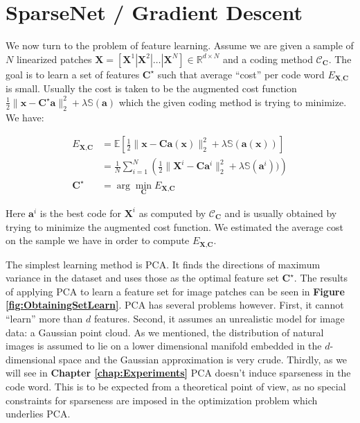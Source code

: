 \documentclass[12pt,a4paper,oneside,english]{UPBThesis}
\newcommand{\hctimes}[2]{{#1}\!\times\!{#2}}
\begin{document}
\section{SparseNet / Gradient Descent}
\label{sec:SparseNetGradientDescent}

We now turn to the problem of feature learning. Assume we are given a sample of $N$ linearized patches $\textbf{X} = \left[ \textbf{X}^1 \left|\right. \textbf{X}^2 \left|\right. \dots \left|\right. \textbf{X}^N \right] \in \mathbb{R}^{\hctimes{d}{N}}$ and a coding method $\mathcal{C}_\textbf{C}$. The goal is to learn a set of features $\textbf{C}^\star$ such that average ``cost'' per code word $E_{\textbf{X},\textbf{C}}$ is small. Usually the cost is taken to be the augmented cost function $\frac{1}{2} \| \textbf{x} - \textbf{C}^\star\textbf{a} \|_2^2 + \lambda \mathbb{S}(\textbf{a})$ which the given coding method is trying to minimize. We have:

\begin{align*}
E_{\textbf{X},\textbf{C}} & = \mathbb{E} [ \frac{1}{2} \| \textbf{x} - \textbf{C}\textbf{a}(\textbf{x}) \|_2^2 + \lambda\mathbb{S}(\textbf{a}(\textbf{x}))] \\
& = \frac{1}{N} \sum_{i=1}^N{\left( \frac{1}{2} \| \textbf{X}^i - \textbf{C}\textbf{a}^i \|_2^2 + \lambda\mathbb{S}(\textbf{a}^i)) \right)} \\
\textbf{C}^\star & = \arg\min_\textbf{C} E_{\textbf{X},\textbf{C}}
\end{align*}

Here $\textbf{a}^i$ is the best code for $\textbf{X}^i$ as computed by $\mathcal{C}_\textbf{C}$ and is usually obtained by trying to minimize the augmented cost function. We estimated the average cost on the sample we have in order to compute $E_{\textbf{X},\textbf{C}}$.

The simplest learning method is PCA. It finds the directions of maximum variance in the dataset and uses those as the optimal feature set $\textbf{C}^\star$. The results of applying PCA to learn a feature set for image patches can be seen in \textbf{Figure \ref{fig:ObtainingSetLearn}}. PCA has several problems however. First, it cannot ``learn'' more than $d$ features. Second, it assumes an unrealistic model for image data: a Gaussian point cloud. As we mentioned, the distribution of natural images is assumed to lie on a lower dimensional manifold embedded in the $d$-dimensional space and the Gaussian approximation is very crude. Thirdly, as we will see in \textbf{Chapter \ref{chap:Experiments}} PCA doesn't induce sparseness in the code word. This is to be expected from a theoretical point of view, as no special constraints for sparseness are imposed in the optimization problem which underlies PCA.
\end{document}
